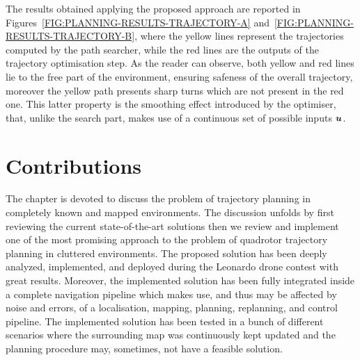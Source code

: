 The results obtained applying the proposed approach are reported in Figures~\ref{FIG:PLANNING-RESULTS-TRAJECTORY-A} and~\ref{FIG:PLANNING-RESULTS-TRAJECTORY-B},
where the yellow lines represent the trajectories computed by the path searcher, while the red lines are the outputs of the trajectory optimisation step.
As the reader can observe, both yellow and red lines lie to the free part of the environment, ensuring safeness of the overall trajectory,
moreover the yellow path presents sharp turns which are not present in the red one.
This latter property is the smoothing effect introduced by the optimiser, that, unlike the search part,
makes use of a continuous set of possible inputs $\boldsymbol{u}$.

\section{Contributions}
The chapter is devoted to discuss the problem of trajectory planning in completely known and mapped environments.
The discussion unfolds by first reviewing the current state-of-the-art solutions then we review and implement one of the most promising
approach to the problem of quadrotor trajectory planning in cluttered environments. The proposed solution has been deeply analyzed,
implemented, and deployed during the Leonardo drone contest with great results. Moreover, the implemented solution has been fully
integrated inside a complete navigation pipeline which makes use, and thus may be affected by noise and errors, of a localisation,
mapping, planning, replanning, and control pipeline. The implemented solution has been tested in a bunch of different scenarios where
the surrounding map was continuously kept updated and the planning procedure may, sometimes, not have a feasible solution.

